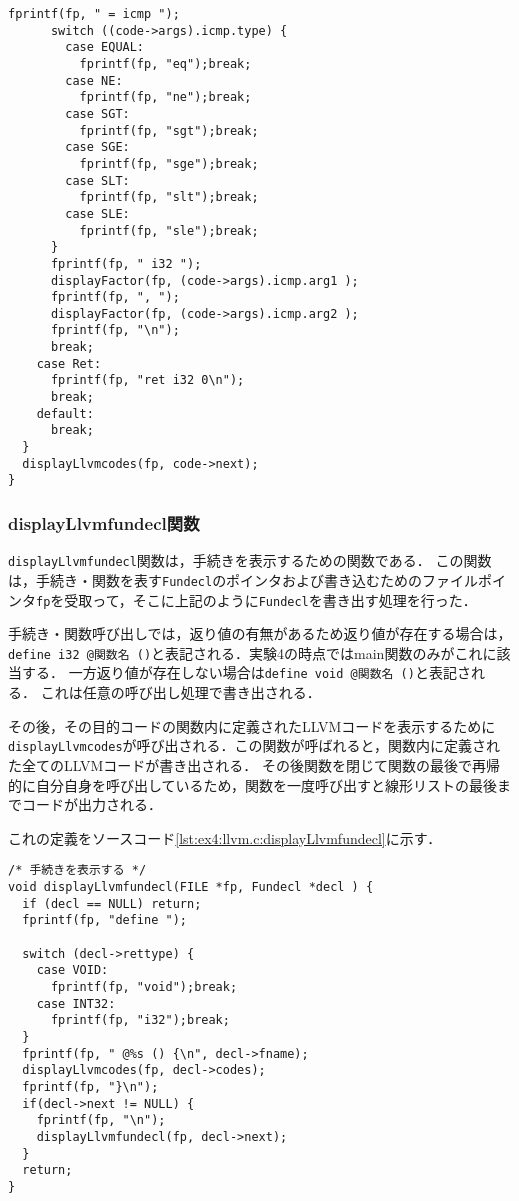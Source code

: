 \documentclass[uplatex]{jsarticle}
\begin{document}
\begin{lstlisting}[caption=displayLlvmcodes関数の定義,label=lst:ex4:llvm.c:displayLlvmcodes]
      fprintf(fp, " = icmp ");
      switch ((code->args).icmp.type) {
        case EQUAL:
          fprintf(fp, "eq");break;
        case NE:
          fprintf(fp, "ne");break;
        case SGT:
          fprintf(fp, "sgt");break;
        case SGE:
          fprintf(fp, "sge");break;
        case SLT:
          fprintf(fp, "slt");break;
        case SLE:
          fprintf(fp, "sle");break;
      }
      fprintf(fp, " i32 ");
      displayFactor(fp, (code->args).icmp.arg1 );
      fprintf(fp, ", ");
      displayFactor(fp, (code->args).icmp.arg2 );
      fprintf(fp, "\n");
      break;
    case Ret:
      fprintf(fp, "ret i32 0\n");
      break;
    default:
      break;
  }
  displayLlvmcodes(fp, code->next);
}
\end{lstlisting}

\subsubsection{displayLlvmfundecl関数}
\verb#displayLlvmfundecl#関数は，手続きを表示するための関数である．
この関数は，手続き・関数を表す\verb#Fundecl#のポインタおよび書き込むためのファイルポインタ\verb#fp#を受取って，そこに上記のように\verb#Fundecl#を書き出す処理を行った．

手続き・関数呼び出しでは，返り値の有無があるため返り値が存在する場合は，
\verb#define i32 @関数名 ()#と表記される．実験4の時点ではmain関数のみがこれに該当する．
一方返り値が存在しない場合は\verb#define void @関数名 ()#と表記される．
これは任意の呼び出し処理で書き出される．

その後，その目的コードの関数内に定義されたLLVMコードを表示するために\verb#displayLlvmcodes#が呼び出される．この関数が呼ばれると，関数内に定義された全てのLLVMコードが書き出される．
その後関数を閉じて関数の最後で再帰的に自分自身を呼び出しているため，関数を一度呼び出すと線形リストの最後までコードが出力される．

これの定義をソースコード\ref{lst:ex4:llvm.c:displayLlvmfundecl}に示す．

\begin{lstlisting}[caption=displayLlvmfundecl関数の定義,label=lst:ex4:llvm.c:displayLlvmfundecl]
/* 手続きを表示する */
void displayLlvmfundecl(FILE *fp, Fundecl *decl ) {
  if (decl == NULL) return;
  fprintf(fp, "define ");

  switch (decl->rettype) {
    case VOID:
      fprintf(fp, "void");break;
    case INT32:
      fprintf(fp, "i32");break;
  }
  fprintf(fp, " @%s () {\n", decl->fname);
  displayLlvmcodes(fp, decl->codes);
  fprintf(fp, "}\n");
  if(decl->next != NULL) {
    fprintf(fp, "\n");
    displayLlvmfundecl(fp, decl->next);
  }
  return;
}
\end{lstlisting}
\end{document}
